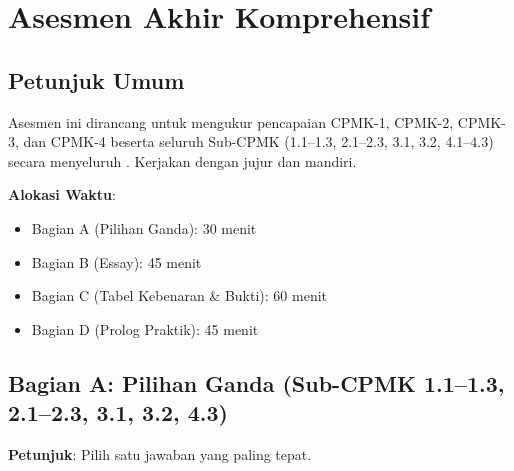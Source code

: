 \section{Asesmen Akhir Komprehensif}

\subsection{Petunjuk Umum}

Asesmen ini dirancang untuk mengukur pencapaian CPMK-1, CPMK-2, CPMK-3, dan CPMK-4 beserta seluruh Sub-CPMK (1.1--1.3, 2.1--2.3, 3.1, 3.2, 4.1--4.3) secara menyeluruh \cite{rosen2019}. Kerjakan dengan jujur dan mandiri.

\textbf{Alokasi Waktu}:
\begin{itemize}
  \item Bagian A (Pilihan Ganda): 30 menit
  \item Bagian B (Essay): 45 menit
  \item Bagian C (Tabel Kebenaran \& Bukti): 60 menit
  \item Bagian D (Prolog Praktik): 45 menit
\end{itemize}

\subsection{Bagian A: Pilihan Ganda (Sub-CPMK 1.1--1.3, 2.1--2.3, 3.1, 3.2, 4.3)}

\textbf{Petunjuk}: Pilih satu jawaban yang paling tepat.

